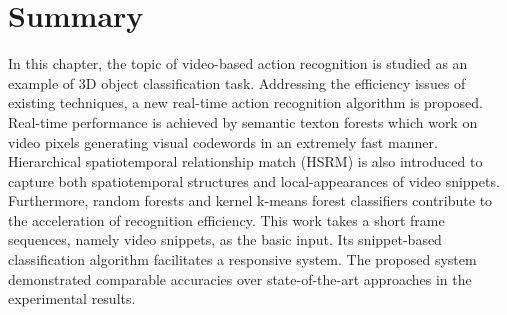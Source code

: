 \section{Summary}
\label{sec/act/discussion}
In this chapter, the topic of video-based action recognition is studied as an example of 3D object classification task. 
Addressing the efficiency issues of existing techniques, a new real-time action recognition algorithm is proposed. 
Real-time performance is achieved by semantic texton forests which work on video pixels generating visual codewords in an extremely fast manner. Hierarchical spatiotemporal relationship match (HSRM) is also introduced to capture both spatiotemporal structures and local-appearances of video snippets. 
Furthermore, random forests and kernel k-means forest classifiers contribute to the acceleration of recognition efficiency. 
This work takes a short frame sequences, namely video snippets, as the basic input. Its snippet-based classification algorithm facilitates a responsive system. 
The proposed system demonstrated comparable accuracies over state-of-the-art approaches in the experimental results. 

